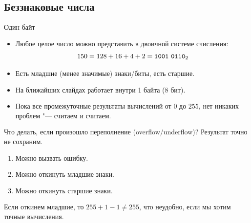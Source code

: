 \subsection{Беззнаковые числа}

\begin{frame}
\end{frame}

\begin{frame}[t]{Один байт}
	\begin{itemize}
		\item
			Любое целое число можно представить в двоичной системе счисления:
			\[ 150 = 128 + 16 + 4 + 2 = \t{1001~0110}_2 \]
		\item
			Есть младшие (менее значимые) знаки/биты, есть старшие.
		\item
			На ближайших слайдах работает внутри 1 байта (8 бит).
		\item
			Пока все промежуточные результаты вычислений от $0$ до $255$, нет никаких проблем "--- считаем и считаем.
	\end{itemize}
	Что делать, если произошло переполнение (overflow/underflow)?
	Результат точно не сохраним.
	\begin{enumerate}
		\item Можно вызвать ошибку.
		\item Можно откинуть младшие знаки.
		\item Можно откинуть старшие знаки.
	\end{enumerate}
	Если откинем младшие, то $255+1-1\neq 255$, что неудобно, если мы хотим точные вычисления.
\end{frame}

